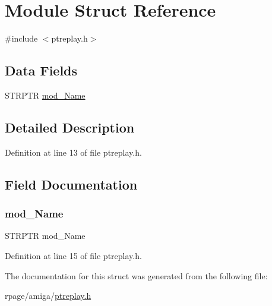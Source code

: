 \hypertarget{struct_module}{}\section{Module Struct Reference}
\label{struct_module}


{\ttfamily \#include $<$ptreplay.\+h$>$}

\subsection*{Data Fields}
\begin{DoxyCompactItemize}
\item 
S\+T\+R\+P\+TR \mbox{\hyperlink{struct_module_ad877244ff40a26d9fbbd46c6a2cf8b0f}{mod\+\_\+\+Name}}
\end{DoxyCompactItemize}


\subsection{Detailed Description}


Definition at line 13 of file ptreplay.\+h.



\subsection{Field Documentation}
\mbox{\label{struct_module_ad877244ff40a26d9fbbd46c6a2cf8b0f}} 
\subsubsection{\texorpdfstring{mod\_Name}{mod\_Name}}
{\footnotesize\ttfamily S\+T\+R\+P\+TR mod\+\_\+\+Name}



Definition at line 15 of file ptreplay.\+h.



The documentation for this struct was generated from the following file\+:\begin{DoxyCompactItemize}
\item 
rpage/amiga/\mbox{\hyperlink{ptreplay_8h}{ptreplay.\+h}}\end{DoxyCompactItemize}

